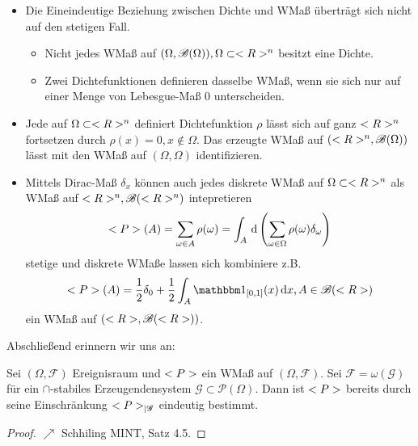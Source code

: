 \begin{*remark}
	\begin{itemize}
		\item Die Eineindeutige Beziehung zwischen Dichte und WMaß überträgt sich nicht auf den stetigen Fall.
		\begin{itemize}
			\item Nicht jedes WMaß auf $(\Omega, \mathscr{B}(\Omega)), \Omega \subset <R>^n$ besitzt eine Dichte.
			\item Zwei Dichtefunktionen definieren dasselbe WMaß, wenn sie sich nur auf einer Menge von Lebesgue-Maß $0$ unterscheiden.
		\end{itemize}
		\item Jede auf $\Omega \subset <R>^n$ definiert Dichtefunktion $\rho$ lässt sich auf ganz $<R>^n$ fortsetzen durch $\rho(x) = 0, x \not\in \Omega$. Das erzeugte WMaß auf $(<R>^n, \mathscr{B}(\Omega))$ lässt mit den WMaß auf $(\Omega, \mathscr{\Omega})$ identifizieren.
		\item Mittels Dirac-Maß $\delta_{x}$ können auch jedes diskrete WMaß auf $\Omega \subset <R>^n$ als WMaß auf $<R>^n, \mathscr{B}(<R>^n)$ intepretieren
		\begin{align}
			<P>(A) = \sum_{\omega \in A} \rho(\omega) = \int_{A} \,\mathrm{d} \left( \sum_{\omega \in \Omega} \rho(\omega)\delta_{\omega} \right)\notag
		\end{align}
		stetige und diskrete WMaße lassen sich kombiniere z.B.
		\begin{align}
			\probp(A) = \frac{1}{2} \delta_{0} + \frac{1}{2} \int_{A}\one_{[0,1]}(x)\diff x, A \in \mathscr{B}(\R)\notag
		\end{align}
		ein WMaß auf $(<R>, \mathscr{B}(<R>))$.
	\end{itemize}
\end{*remark}

Abschließend erinnern wir uns an:

\begin{proposition}
	Sei $(\Omega, \mathscr{F})$ Ereignisraum und $<P>$ ein WMaß auf $(\Omega, \mathscr{F})$. 
	Sei $\mathscr{F} = \omega(\mathscr{G})$ für ein $\cap$-stabiles Erzeugendensystem $\mathscr{G} \subset \mathscr{P}(\Omega)$. 
	Dann ist $<P>$ bereits durch seine Einschränkung $<P>_{\mid \mathscr{G}}$ eindeutig bestimmt.
\end{proposition}

\begin{proof}
	$\nearrow$ Schhiling MINT, Satz 4.5.
\end{proof}

